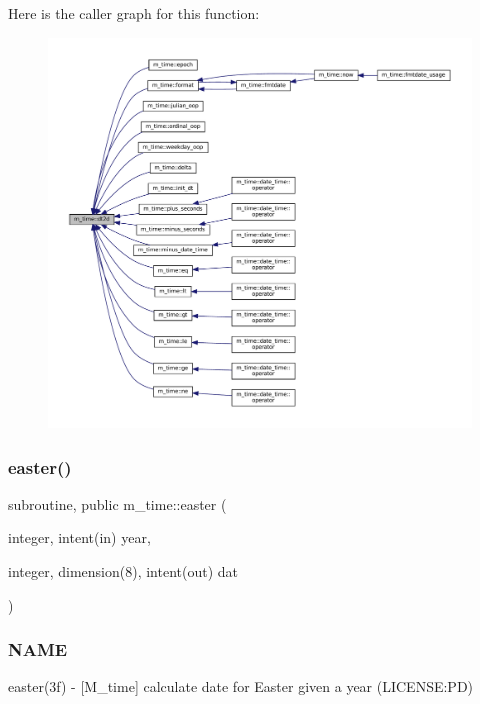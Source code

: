 Here is the caller graph for this function\+:\nopagebreak
\begin{figure}[H]
\begin{center}
\leavevmode
\includegraphics[width=350pt]{namespacem__time_aa281690d7f68f14842b00d238702e774_icgraph}
\end{center}
\end{figure}
\mbox{\label{namespacem__time_a5ccb70e20160fcf26bb403dbff1f138a}} 
\subsubsection{\texorpdfstring{easter()}{easter()}}
{\footnotesize\ttfamily subroutine, public m\+\_\+time\+::easter (\begin{DoxyParamCaption}\item[{integer, intent(in)}]{year,  }\item[{integer, dimension(8), intent(out)}]{dat }\end{DoxyParamCaption})}



\subsubsection*{N\+A\+ME}

easter(3f) -\/ \mbox{[}M\+\_\+time\mbox{]} calculate date for Easter given a year (L\+I\+C\+E\+N\+SE\+:PD) 

